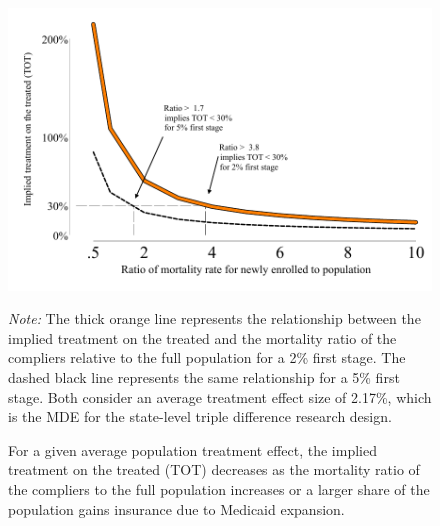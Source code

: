 \documentclass[12pt]{article}%
\begin{document}
   \begin{figure}[H]
    \caption{For a given average population treatment effect, the implied treatment on the treated (TOT) decreases as the mortality ratio of the compliers to the full population increases or a larger share of the population gains insurance due to Medicaid expansion.}
      \includegraphics[width=\linewidth]{../output/figures/mort_ratio_tot_mde_217.pdf}
       \begin{justify}
                {\footnotesize
                    \emph{Note:} 
       The thick orange line represents the relationship between the implied treatment on the treated and the mortality ratio of the compliers relative to the full population for a 2\% first stage. 
       The dashed black line represents the same relationship for a 5\% first stage. 
       Both consider an average treatment effect size of 2.17\%, which is the MDE for the state-level triple difference research design. 
                \par}
            \end{justify}
             \label{fig:mortality_ratio}
    \end{figure}
\end{document}
